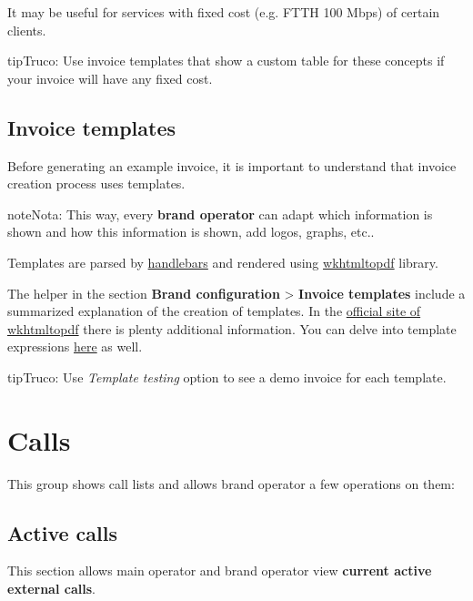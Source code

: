 \documentclass[letterpaper,10pt,spanish]{sphinxmanual}
\begin{document}
It may be useful for services with fixed cost (e.g. FTTH 100 Mbps) of certain clients.

\begin{notice}{tip}{Truco:}
Use invoice templates that show a custom table for these concepts if your invoice will have any fixed cost.
\end{notice}


\subsection{Invoice templates}
\label{administration_portal/brand/invoicing/invoice_templates::doc}\label{administration_portal/brand/invoicing/invoice_templates:invoice-templates}
Before generating an example invoice, it is important to understand that invoice
creation process uses templates.

\begin{notice}{note}{Nota:}
This way, every \textbf{brand operator} can adapt which information
is shown and how this information is shown, add logos, graphs, etc..
\end{notice}

Templates are parsed by \href{https://github.com/XaminProject/handlebars.php}{handlebars} and rendered
using \href{https://wkhtmltopdf.org/}{wkhtmltopdf} library.

The helper in the section \textbf{Brand configuration} \textgreater{} \textbf{Invoice templates} include
a summarized explanation of the creation of templates. In the \href{https://wkhtmltopdf.org/usage/wkhtmltopdf.txt}{official site of wkhtmltopdf} there is plenty additional information.
You can delve into template expressions \href{http://handlebarsjs.com/expressions.html}{here} as well.

\begin{notice}{tip}{Truco:}
Use \emph{Template testing} option to see a demo invoice for each template.
\end{notice}


\section{Calls}
\label{administration_portal/brand/calls/index::doc}\label{administration_portal/brand/calls/index:calls}
This group shows call lists and allows brand operator a few operations on them:


\subsection{Active calls}
\label{administration_portal/brand/calls/active_calls::doc}\label{administration_portal/brand/calls/active_calls:active-calls}
This section allows main operator and brand operator view \textbf{current active external calls}.
\end{document}
